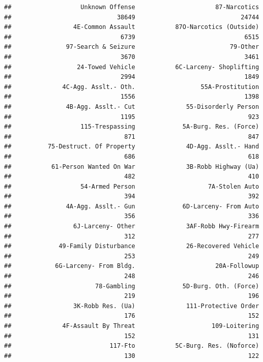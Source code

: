 \documentclass[]{article}
\theoremstyle{definition}
\theoremstyle{definition}
\theoremstyle{remark}
\begin{document}
\begin{verbatim}
##                   Unknown Offense                      87-Narcotics 
##                             38649                             24744 
##                 4E-Common Assault           87O-Narcotics (Outside) 
##                              6739                              6515 
##               97-Search & Seizure                          79-Other 
##                              3670                              3461 
##                  24-Towed Vehicle           6C-Larceny- Shoplifting 
##                              2994                              1849 
##              4C-Agg. Asslt.- Oth.                  55A-Prostitution 
##                              1556                              1398 
##               4B-Agg. Asslt.- Cut              55-Disorderly Person 
##                              1195                               923 
##                   115-Trespassing             5A-Burg. Res. (Force) 
##                               871                               847 
##          75-Destruct. Of Property              4D-Agg. Asslt.- Hand 
##                               686                               618 
##           61-Person Wanted On War              3B-Robb Highway (Ua) 
##                               482                               410 
##                   54-Armed Person                    7A-Stolen Auto 
##                               394                               392 
##               4A-Agg. Asslt.- Gun             6D-Larceny- From Auto 
##                               356                               336 
##                 6J-Larceny- Other              3AF-Robb Hwy-Firearm 
##                               312                               277 
##             49-Family Disturbance              26-Recovered Vehicle 
##                               253                               249 
##            6G-Larceny- From Bldg.                      20A-Followup 
##                               248                               246 
##                       78-Gambling             5D-Burg. Oth. (Force) 
##                               219                               196 
##                 3K-Robb Res. (Ua)              111-Protective Order 
##                               176                               152 
##              4F-Assault By Threat                     109-Loitering 
##                               152                               131 
##                           117-Fto           5C-Burg. Res. (Noforce) 
##                               130                               122 

\end{verbatim}
\end{document}
